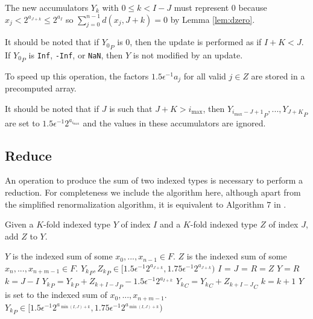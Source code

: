    The new accumulators $Y_k$ with $0 \leq k < I - J$ must represent 0 because $x_j < 2^{a_{J + k}} \leq 2^{a_I}$ so $\sum\limits_{j = 0}^{n - 1} d(x_j, J + k) = 0$ by Lemma \ref{lem:dzero}.

    It should be noted that if ${Y_0}_P$ is 0, then the update is performed as if $I + K < J$. If ${Y_0}_P$ is \texttt{Inf}, \texttt{-Inf}, or \texttt{NaN}, then $Y$ is not modified by an update.

    To speed up this operation, the factors $1.5  \epsilon^{-1}  a_j$ for all valid $j \in Z$ are stored in a precomputed array.

    It should be noted that if $J$ is such that $J + K > i_{\max}$, then ${Y_{i_{\max} - J + 1}}_P, ...,  {Y_{J + K}}_P$ are set to $1.5 \epsilon^{-1}2^{a_{i_{\max}}}$ and the values in these accumulators are ignored.

  \subsection{Reduce}
    \label{sec:primitiveops_reduce}
    An operation to produce the sum of two indexed types is necessary to perform a reduction. For completeness we include the algorithm here, although apart from the simplified renormalization algorithm, it is equivalent to Algorithm $7$ in \cite{repsum}.

    \begin{samepage}
    \begin{alg}
      Given a $K$-fold indexed type $Y$ of index $I$ and a $K$-fold indexed type $Z$ of index $J$, add $Z$ to $Y$.
      \begin{algorithmic}[1]
        \Ensure
          \Statex $Y$ is the indexed sum of some $x_0, ..., x_{n - 1} \in F$.
          \Statex $Z$ is the indexed sum of some $x_n, ..., x_{n + m - 1} \in F$.
          \Statex ${Y_k}_P, {Z_k}_P \in [1.5  \epsilon^{-1} 2^{a_{J + k}}, 1.75  \epsilon^{-1} 2^{a_{J + k}})$
          \State $I$ = 
          \State $J$ = 
            \State $R = Z$
            \State {}
            \State $Y = R$
          \EndIf
          \State $k = J - I$
            \State ${Y_{k}}_P = {Y_{k}}_P + {Z_{k + I - J}}_P - 1.5  \epsilon^{-1}  2^{a_{I + k}}$
            \State ${Y_{k}}_C = {Y_{k}}_C + {Z_{k + I - J}}_C$
            \State $k = k + 1$
          \EndWhile
          \State {}
        \EndFunction
        \Ensure
          \Statex $Y$ is set to the indexed sum of $x_0, ..., x_{n + m - 1}$.
          \Statex ${Y_k}_P \in [1.5  \epsilon^{-1} 2^{a_{\min(I, J) + k}}, 1.75  \epsilon^{-1} 2^{a_{\min(I, J) + k}})$
      \end{algorithmic}
      \label{alg:reduce}
    \end{alg}
    \end{samepage}

